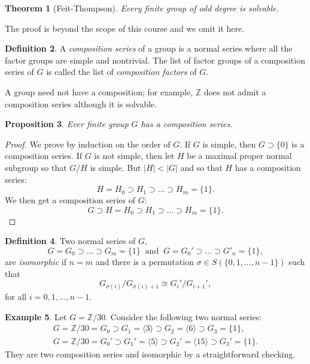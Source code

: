 \documentclass[12pt]{report}
\newtheorem{theorem}{Theorem}[section]
\newtheorem{proposition}[theorem]{Proposition}
{\theoremstyle{remark}\newtheorem*{remark}{Remark}}
\theoremstyle{definition}
\newtheorem{definition}[theorem]{Definition}
\newtheorem{example}[theorem]{Example}
\newcommand{\zz}{\mathbb{Z}}
\newcommand{\ta}[1]{\langle #1 \rangle}
\begin{document}
\begin{theorem}[Feit-Thompson]
	Every finite group of odd degree is solvable.
\end{theorem}

The proof is beyond the scope of this course and we omit it here.

\begin{definition}
	A \emph{composition series} of a group is a normal series where all the factor groups are simple and nontrivial. The list of factor groups of a composition series of $G$ is called the list of \emph{composition factors} of $G$.
\end{definition}

A group need not have a composition; for example, $\zz$ does not admit a composition series although it is solvable.

\begin{proposition}
	Ever finite group $G$ has a composition series.
\end{proposition}

\begin{proof}
	We prove by induction on the order of $G$. If $G$ is simple, then $G\supset \{0\}$ is a composition series. If $G$ is not simple, then let $H$ be a maximal proper normal subgroup so that $G/H$ is simple. But $|H|<|G|$ and so that $H$ has a composition series: $$H=H_0\supset H_1\supset \dots\supset H_m=\{1\}.$$ We then get a composition series of $G$: $$G\supset H=H_0 \supset H_1\supset \dots\supset H_m=\{1\}.$$
\end{proof}

\begin{definition}
	Two normal series of $G$, $$G=G_0\supset \dots\supset G_m=\{1\}~\mbox{ and }~ G=G_0'\supset \dots\supset G'_n=\{1\},$$ are \emph{isomorphic} if $n=m$ and there is a permutation $\sigma\in S(\{0,1,\dots,n-1\})$ such that $$G_{\sigma(i)}/G_{\sigma(i)+1} \cong G_{i}'/G_{i+1}', $$ for all $i=0,1,\dots,n-1$.
\end{definition}

\begin{example}
	Let $G=\zz/30$. Consider the following two normal series:
	\begin{align*}
		G=\zz/30=G_0 \supset G_1=\ta{3} \supset G_2=\ta{6}\supset G_3=\{1\}, \\
		G=\zz/30 = G_0' \supset G_1'=\ta{5} \supset G_2'=\ta{15} \supset G_3'=\{1\}.
	\end{align*}
	They are two composition series and isomorphic by a straightforward checking.
\end{example}
\end{document}
